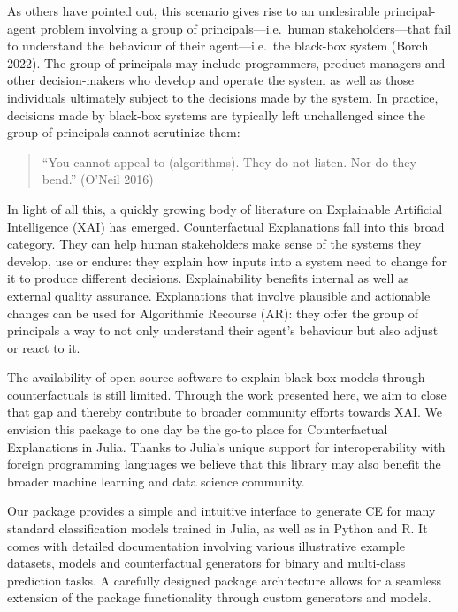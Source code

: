 \documentclass{juliacon}
\begin{document}
As others have pointed out, this scenario gives rise to an undesirable
principal-agent problem involving a group of principals---i.e.~human
stakeholders---that fail to understand the behaviour of their
agent---i.e.~the black-box system (Borch 2022). The group of principals
may include programmers, product managers and other decision-makers who
develop and operate the system as well as those individuals ultimately
subject to the decisions made by the system. In practice, decisions made
by black-box systems are typically left unchallenged since the group of
principals cannot scrutinize them:

\begin{quote}
``You cannot appeal to (algorithms). They do not listen. Nor do they
bend.'' (O'Neil 2016)
\end{quote}

In light of all this, a quickly growing body of literature on
Explainable Artificial Intelligence (XAI) has emerged. Counterfactual
Explanations fall into this broad category. They can help human
stakeholders make sense of the systems they develop, use or endure: they
explain how inputs into a system need to change for it to produce
different decisions. Explainability benefits internal as well as
external quality assurance. Explanations that involve plausible and
actionable changes can be used for Algorithmic Recourse (AR): they offer
the group of principals a way to not only understand their agent's
behaviour but also adjust or react to it.

The availability of open-source software to explain black-box models
through counterfactuals is still limited. Through the work presented
here, we aim to close that gap and thereby contribute to broader
community efforts towards XAI. We envision this package to one day be
the go-to place for Counterfactual Explanations in Julia. Thanks to
Julia's unique support for interoperability with foreign programming
languages we believe that this library may also benefit the broader
machine learning and data science community.

Our package provides a simple and intuitive interface to generate CE for
many standard classification models trained in Julia, as well as in
Python and R. It comes with detailed documentation involving various
illustrative example datasets, models and counterfactual generators for
binary and multi-class prediction tasks. A carefully designed package
architecture allows for a seamless extension of the package
functionality through custom generators and models.
\end{document}
